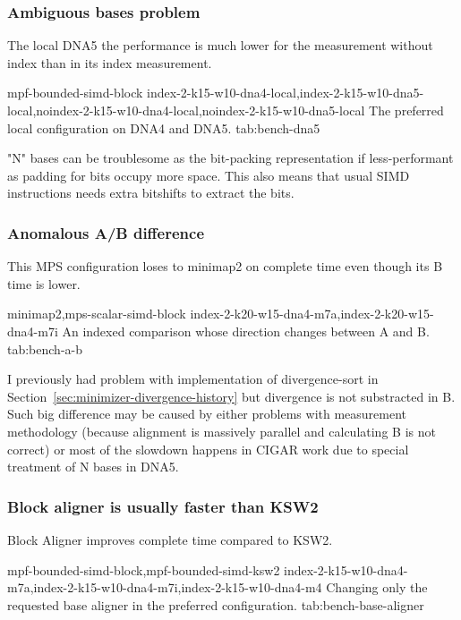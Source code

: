 \subsubsection{Ambiguous bases problem}
\label{sec:bench-dna5}

The local DNA5 the performance is much lower for the measurement without index than in its index measurement.

  {mpf-bounded-simd-block}
  {index-2-k15-w10-dna4-local,index-2-k15-w10-dna5-local,noindex-2-k15-w10-dna4-local,noindex-2-k15-w10-dna5-local}
  {The preferred local configuration on DNA4 and DNA5.}
  {tab:bench-dna5}

"N" bases can be troublesome as the bit-packing representation if less-performant as padding for bits occupy more space.
This also means that usual SIMD instructions needs extra bitshifts to extract the bits.

\subsubsection{Anomalous A/B difference}
\label{sec:bench-a-b}

This MPS configuration loses to minimap2 on complete time even though its
B time is lower.

  {minimap2,mps-scalar-simd-block}
  {index-2-k20-w15-dna4-m7a,index-2-k20-w15-dna4-m7i}
  {An indexed comparison whose direction changes between A and B.}
  {tab:bench-a-b}

I previously had problem with implementation of divergence-sort in
Section~\ref{sec:minimizer-divergence-history} but divergence is not substracted in B.
Such big difference may be caused by either problems with measurement methodology (because alignment is massively parallel and calculating B is not correct) or most of the slowdown happens in CIGAR work
due to special treatment of N bases in DNA5.

\subsubsection{Block aligner is usually faster than KSW2}
\label{sec:bench-base-aligner}

Block Aligner improves complete time compared to KSW2.

  {mpf-bounded-simd-block,mpf-bounded-simd-ksw2}
  {index-2-k15-w10-dna4-m7a,index-2-k15-w10-dna4-m7i,index-2-k15-w10-dna4-m4}
  {Changing only the requested base aligner in the preferred configuration.}
  {tab:bench-base-aligner}

